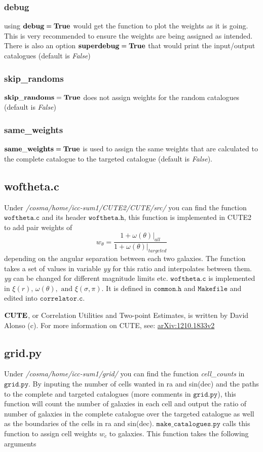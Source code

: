 \documentclass[12pt,helvetica,margin=2.5cm,a4paper,final]{iopart}
\begin{document}
\subsubsection{debug}
using $\bold{debug=True}$ would get the function to plot the weights as it is going. This is very recommended to ensure the weights are being assigned as intended.
There is also an option $\bold{superdebug=True}$ that would print the input/output catalogues (default is \emph{False})
\subsubsection{skip\_randoms}
$\bold{skip\_randoms=True}$ does not assign weights for the random catalogues (default is \emph{False})
\subsubsection{same\_weights}
$\bold{same\_weights=True}$ is used to assign the same weights that are calculated to the complete catalogue to the targeted catalogue (default is \emph{False}).

\subsection{woftheta.c}
\label{woftheta}
Under \emph{/cosma/home/icc-sum1/CUTE2/CUTE/src/} you can find the function $\mathtt{woftheta.c}$ and its header $\mathtt{woftheta.h}$, this function is implemented in CUTE2 to add pair weights of 
\begin{equation}
w_\theta = \frac{1 + \omega(\theta)|_{all}}{1 + \omega(\theta)|_{targeted}}
\end{equation}
depending on the angular separation between each two galaxies. 
The function takes a set of values in variable \emph{yy} for this ratio and interpolates between them. \emph{yy} can be changed for different magnitude limits etc. 
$\mathtt{woftheta.c}$ is implemented in $\xi(r), \, \omega(\theta), \, \, \textrm{and} \, \, \xi(\sigma, \pi)$. It is defined in $\mathtt{common.h}$ and $\mathtt{Makefile}$ and edited into $\mathtt{correlator.c}$.

$\bold{CUTE}$, or Correlation Utilities and Two-point Estimates, is written by David Alonso (c). For more information on CUTE, see: \href{arXiv:1210.1833v2}{arXiv:1210.1833v2}
\subsection{grid.py}
Under \emph{/cosma/home/icc-sum1/grid/} you can find the function \emph{cell\_counts} in $\mathtt{grid.py}$. By inputing the number of cells wanted in ra and sin(dec) and the paths to the complete and targeted catalogues (more comments in $\mathtt{grid.py}$), this function will count the number of galaxies in each cell and output the ratio of number of galaxies in the complete catalogue over the targeted catalogue as well as the boundaries of the cells in ra and sin(dec). $\mathtt{make\_catalogues.py}$ calls this function to assign cell weights $w_c$ to galaxies. This function takes the following arguments
\end{document}
